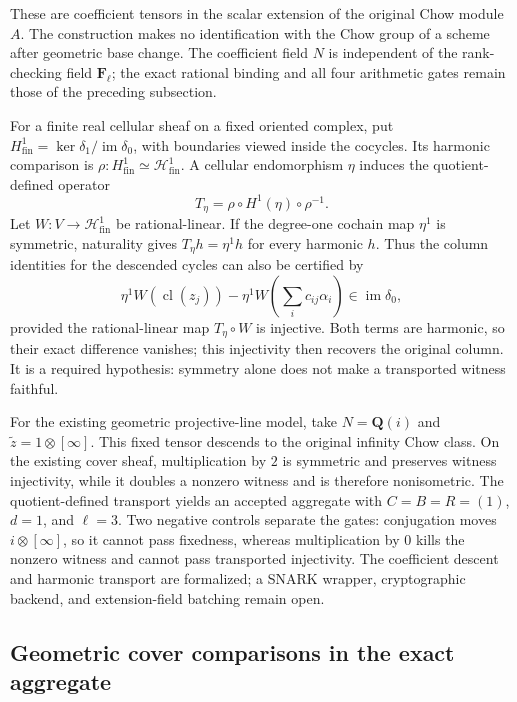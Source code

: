 \documentclass[11pt]{article}
\theoremstyle{definition}
\theoremstyle{remark}
\newcommand{\Q}{\mathbf Q}
\begin{document}
These are coefficient tensors in the scalar extension of the original Chow
module \(A\). The construction makes no identification with the Chow group
of a scheme after geometric base change. The coefficient field \(N\) is
independent of the rank-checking field \(\mathbf F_\ell\); the exact rational
binding and all four arithmetic gates remain those of the preceding subsection.

For a finite real cellular sheaf on a fixed oriented complex, put
\(H^1_{\mathrm{fin}}=\ker\delta_1/\operatorname{im}\delta_0\), with boundaries
viewed inside the cocycles. Its harmonic comparison is
\(\rho:H^1_{\mathrm{fin}}\simeq\mathcal H^1_{\mathrm{fin}}\).
A cellular endomorphism \(\eta\) induces the quotient-defined operator
\[
 T_\eta=\rho\circ H^1(\eta)\circ\rho^{-1}.
\]
Let \(W:V\to\mathcal H^1_{\mathrm{fin}}\) be rational-linear.
If the degree-one cochain map \(\eta^1\) is symmetric, naturality gives
\(T_\eta h=\eta^1h\) for every harmonic \(h\).
Thus the column identities for the descended cycles can also be certified by
\[
 \eta^1W(\operatorname{cl}(z_j))-
 \eta^1W\!\left(\sum_i c_{ij}\alpha_i\right)
       \in\operatorname{im}\delta_0,
\]
provided the rational-linear map \(T_\eta\circ W\) is injective.
Both terms are harmonic, so their exact difference vanishes; this injectivity
then recovers the original column. It is a required hypothesis: symmetry
alone does not make a transported witness faithful.

For the existing geometric projective-line model, take \(N=\Q(i)\) and
\(\widetilde z=1\otimes[\infty]\). This fixed tensor descends to the original
infinity Chow class. On the existing cover sheaf, multiplication by \(2\)
is symmetric and preserves witness injectivity, while it doubles a nonzero
witness and is therefore nonisometric. The quotient-defined transport yields
an accepted aggregate with \(C=B=R=(1)\), \(d=1\), and \(\ell=3\).
Two negative controls separate the gates: conjugation moves
\(i\otimes[\infty]\), so it cannot pass fixedness, whereas multiplication
by \(0\) kills the nonzero witness and cannot pass transported injectivity.
The coefficient descent and harmonic transport are formalized; a SNARK
wrapper, cryptographic backend, and extension-field batching remain open.

\subsection{Geometric cover comparisons in the exact aggregate}
\label{subsec:geometric-cover-coverage}
\end{document}
